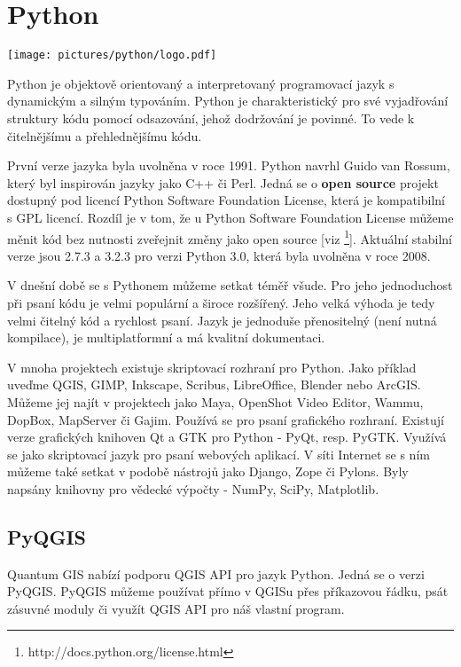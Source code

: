 \newpage
\section{Python}
\nocite{py3:book}


\begin{center}
	\texttt{[image: pictures/python/logo.pdf]}
\end{center}

Python je objektově orientovaný a interpretovaný programovací jazyk s dynamickým a silným typováním. Python je charakteristický pro své vyjadřování struktury kódu pomocí odsazování, jehož dodržování je povinné. To vede k čitelnějšímu a přehlednějšímu kódu. 

První verze jazyka byla uvolněna v roce 1991. Python navrhl Guido van Rossum, který byl inspirován jazyky jako C++ či Perl. Jedná se o \textbf{open source} projekt dostupný pod licencí Python Software Foundation License, která je kompatibilní s GPL licencí. Rozdíl je v tom, že u Python Software Foundation License můžeme měnit kód bez nutnosti zveřejnit změny jako open source [viz \footnote{http://docs.python.org/license.html}]. Aktuální stabilní verze jsou 2.7.3 a 3.2.3 pro verzi Python 3.0, která byla uvolněna v roce 2008. 



V dnešní době se s Pythonem můžeme setkat téměř všude. Pro jeho jednoduchost při psaní kódu je velmi populární a široce rozšířený. Jeho velká výhoda je tedy velmi čitelný kód a rychlost psaní. Jazyk je jednoduše přenositelný (není nutná kompilace), je multiplatformní a má kvalitní dokumentaci. 

V mnoha projektech existuje skriptovací rozhraní pro Python. Jako příklad uveďme QGIS, GIMP, Inkscape, Scribus, LibreOffice, Blender nebo ArcGIS. Můžeme jej najít v projektech jako Maya, OpenShot Video Editor, Wammu, DopBox, MapServer či Gajim. Používá se pro psaní grafického rozhraní. Existují verze grafických knihoven Qt a GTK pro Python - PyQt, resp. PyGTK. Využívá se jako skriptovací jazyk pro psaní webových aplikací. V síti Internet se s ním můžeme také setkat v podobě nástrojů jako Django, Zope či Pylons. Byly napsány knihovny pro vědecké výpočty - NumPy, SciPy, Matplotlib.


\subsection*{PyQGIS}
Quantum GIS nabízí podporu QGIS API pro jazyk Python. Jedná se o verzi PyQGIS. PyQGIS můžeme používat přímo v QGISu přes příkazovou řádku, psát zásuvné moduly či využít QGIS API pro náš vlastní program. 

